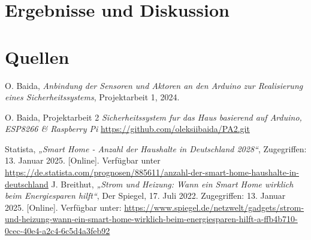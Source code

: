 \documentclass[12pt, letterpaper]{article}
\begin{document}
\newpage
\section{Ergebnisse und Diskussion}

\newpage
\section{Quellen}
\begin{thebibliography}{20}
  O. Baida,
  \textit{Anbindung der Sensoren und Aktoren an den Arduino zur Realisierung eines Sicherheitssystems},
  Projektarbeit 1, 2024.

  O. Baida, Projektarbeit 2 \textit{Sicherheitssystem fur das Haus basierend auf Arduino, ESP8266 \& Raspberry Pi} \url{https://github.com/oleksiibaida/PA2.git}
  
  Statista, \textit{„Smart Home - Anzahl der Haushalte in Deutschland 2028“}, Zugegriffen: 13. Januar 2025. [Online]. Verfügbar unter \url{https://de.statista.com/prognosen/885611/anzahl-der-smart-home-haushalte-in-deutschland}
  J. Breithut, \textit{„Strom und Heizung: Wann ein Smart Home wirklich beim Energiesparen hilft“}, Der Spiegel, 17. Juli 2022. Zugegriffen: 13. Januar 2025. [Online]. Verfügbar unter: \url{https://www.spiegel.de/netzwelt/gadgets/strom-und-heizung-wann-ein-smart-home-wirklich-beim-energiesparen-hilft-a-ffb4b710-0cec-40e4-a2c4-6c5d4a3feb92}



\end{thebibliography}
\end{document}
